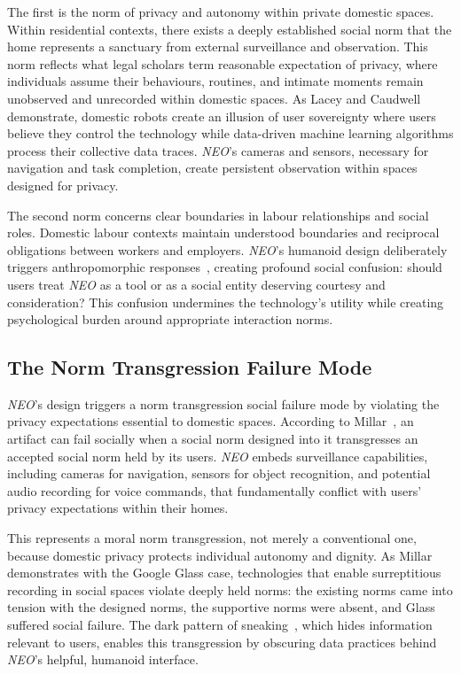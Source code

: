 \documentclass{ieee-portfolio}
\newcommand{\neo}{\textit{NEO}}
\begin{document}
The first is the norm of privacy and autonomy within private domestic spaces. Within residential contexts, there exists a deeply established social norm that the home represents a sanctuary from external surveillance and observation. This norm reflects what legal scholars term reasonable expectation of privacy, where individuals assume their behaviours, routines, and intimate moments remain unobserved and unrecorded within domestic spaces. As Lacey and Caudwell~\cite{lacey_cuteness_2019} demonstrate, domestic robots create an illusion of user sovereignty where users believe they control the technology while data-driven machine learning algorithms process their collective data traces. \neo{}'s cameras and sensors, necessary for navigation and task completion, create persistent observation within spaces designed for privacy.

The second norm concerns clear boundaries in labour relationships and social roles. Domestic labour contexts maintain understood boundaries and reciprocal obligations between workers and employers. \neo{}'s humanoid design deliberately triggers anthropomorphic responses~\cite{darling_whos_2015}, creating profound social confusion: should users treat \neo{} as a tool or as a social entity deserving courtesy and consideration? This confusion undermines the technology's utility while creating psychological burden around appropriate interaction norms.

\subsection{The Norm Transgression Failure Mode}

\neo{}'s design triggers a norm transgression social failure mode by violating the privacy expectations essential to domestic spaces. According to Millar~\cite{millar_social_2020}, an artifact can fail socially when a social norm designed into it transgresses an accepted social norm held by its users. \neo{} embeds surveillance capabilities, including cameras for navigation, sensors for object recognition, and potential audio recording for voice commands, that fundamentally conflict with users' privacy expectations within their homes.

This represents a moral norm transgression, not merely a conventional one, because domestic privacy protects individual autonomy and dignity. As Millar~\cite{millar_social_2020} demonstrates with the Google Glass case, technologies that enable surreptitious recording in social spaces violate deeply held norms: the existing norms came into tension with the designed norms, the supportive norms were absent, and Glass suffered social failure. The dark pattern of sneaking~\cite{gray_dark_2018}, which hides information relevant to users, enables this transgression by obscuring data practices behind \neo{}'s helpful, humanoid interface.
\end{document}
